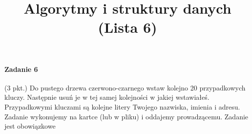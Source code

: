 \documentclass[18pt]{extarticle}
\begin{document}
\large
{}\selectfont

\title{Algorytmy i struktury danych (Lista 6)}
\date{}
\maketitle

\paragraph{Zadanie 6} (3 pkt.) Do pustego drzewa czerwono-czarnego wstaw kolejno 20 przypadkowych kluczy. Następnie usuń je w tej samej kolejności w jakiej wstawiałeś. Przypadkowymi kluczami są kolejne litery Twojego nazwiska, imienia i adresu. Zadanie wykonujemy na kartce (lub w pliku) i oddajemy prowadzącemu. Zadanie jest obowiązkowe
\end{document}
